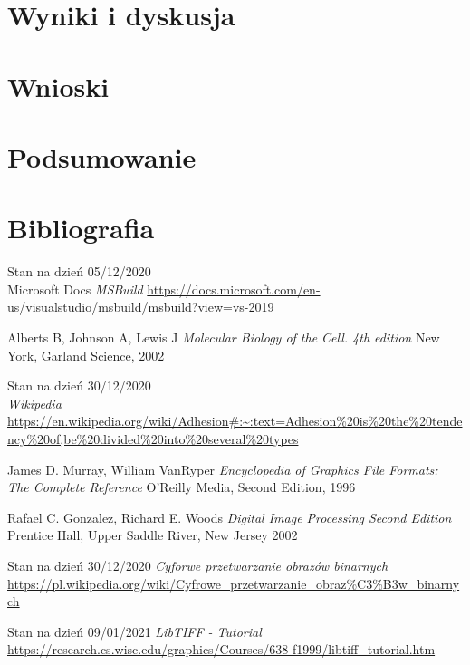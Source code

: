 \documentclass{article}
\begin{document}
    \section{Wyniki i dyskusja}
    \newpage
    \section{Wnioski}
    \newpage
    \section{Podsumowanie}
    \newpage
    \section{Bibliografia}
    \begin{thebibliography}{9}

        Stan na dzień 05/12/2020\\
        Microsoft Docs
        \textit{MSBuild}
        \url{https://docs.microsoft.com/en-us/visualstudio/msbuild/msbuild?view=vs-2019}

        Alberts B, Johnson A, Lewis J
        \textit{Molecular Biology of the Cell. 4th edition}
        New York, Garland Science, 2002

        Stan na dzień 30/12/2020\\
        \textit{Wikipedia}
        \url{https://en.wikipedia.org/wiki/Adhesion#:~:text=Adhesion%20is%20the%20tendency%20of,be%20divided%20into%20several%20types}

        James D. Murray, William VanRyper
        \textit{Encyclopedia of Graphics File Formats: The Complete Reference}
        O'Reilly Media, Second Edition, 1996

        Rafael C. Gonzalez, Richard E. Woods
        \textit{Digital Image Processing Second Edition}
        Prentice Hall, Upper Saddle River, New Jersey 2002 

        Stan na dzień 30/12/2020 
        \textit{Cyforwe przetwarzanie obrazów binarnych}
        \url{https://pl.wikipedia.org/wiki/Cyfrowe_przetwarzanie_obraz%C3%B3w_binarnych}

        Stan na dzień 09/01/2021 
        \textit{LibTIFF - Tutorial}
        \url{https://research.cs.wisc.edu/graphics/Courses/638-f1999/libtiff_tutorial.htm}
    

\end{thebibliography}
\end{document}
